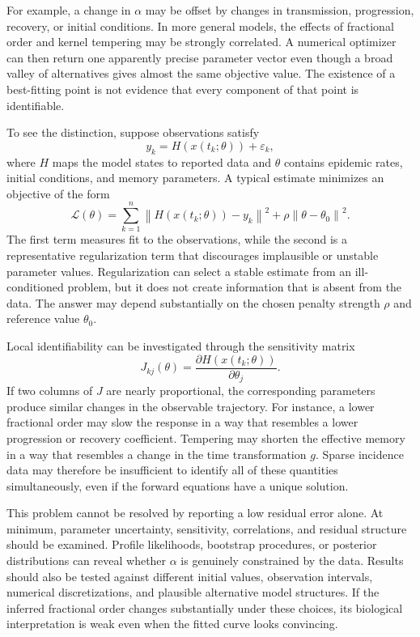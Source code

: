 \documentclass[00-main.tex]{subfiles}
\begin{document}
For example, a change in $\alpha$ may be offset by changes in transmission, progression, recovery, or initial conditions.
In more general models, the effects of fractional order and kernel tempering may be strongly correlated.
A numerical optimizer can then return one apparently precise parameter vector even though a broad valley of alternatives gives almost the same objective value.
The existence of a best-fitting point is not evidence that every component of that point is identifiable.

To see the distinction, suppose observations satisfy
\[
y_k=H(x(t_k;\theta))+\varepsilon_k,
\]
where $H$ maps the model states to reported data and $\theta$ contains epidemic rates, initial conditions, and memory parameters.
A typical estimate minimizes an objective of the form
\[
\mathcal{L}(\theta)
=\sum_{k=1}^{n}
\left\|H(x(t_k;\theta))-y_k\right\|^2
+\rho\left\|\theta-\theta_0\right\|^2.
\]
The first term measures fit to the observations, while the second is a representative regularization term that discourages implausible or unstable parameter values.
Regularization can select a stable estimate from an ill-conditioned problem, but it does not create information that is absent from the data.
The answer may depend substantially on the chosen penalty strength $\rho$ and reference value $\theta_0$.

Local identifiability can be investigated through the sensitivity matrix
\[
J_{kj}(\theta)
=\frac{\partial H(x(t_k;\theta))}{\partial\theta_j}.
\]
If two columns of $J$ are nearly proportional, the corresponding parameters produce similar changes in the observable trajectory.
For instance, a lower fractional order may slow the response in a way that resembles a lower progression or recovery coefficient.
Tempering may shorten the effective memory in a way that resembles a change in the time transformation $g$.
Sparse incidence data may therefore be insufficient to identify all of these quantities simultaneously, even if the forward equations have a unique solution.

This problem cannot be resolved by reporting a low residual error alone.
At minimum, parameter uncertainty, sensitivity, correlations, and residual structure should be examined.
Profile likelihoods, bootstrap procedures, or posterior distributions can reveal whether $\alpha$ is genuinely constrained by the data.
Results should also be tested against different initial values, observation intervals, numerical discretizations, and plausible alternative model structures.
If the inferred fractional order changes substantially under these choices, its biological interpretation is weak even when the fitted curve looks convincing.
\end{document}
